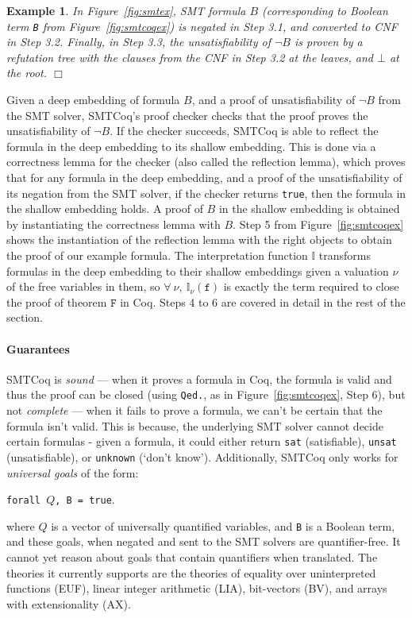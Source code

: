 \documentclass[11pt]{article}
\newtheorem{example}{Example}[section]
\begin{document}
	\begin{example} 
		\em In Figure~\ref{fig:smtex}, 
		SMT formula $B$ (corresponding
		to Boolean term \texttt{B}
		from Figure~\ref{fig:smtcoqex}) is 
		negated in Step 3.1, and converted 
		to CNF in Step 3.2.
		Finally, in Step 3.3, the 
		unsatisfiability of $\neg B$ is 
		proven by a refutation tree with 
		the clauses from the CNF in Step 3.2
		at the leaves, and $\bot$ at the 
		root. \hfill $\Box$
	\end{example}

	Given a deep embedding of 
	formula $B$, and a proof of 
	unsatisfiability of $\neg B$
	from the SMT solver, SMTCoq's proof 
	checker checks that the proof proves
	the unsatisfiability of $\neg B$. If the 
	checker succeeds, SMTCoq is able to 
	reflect the formula in 
	the deep embedding to its shallow 
	embedding. This is done via a 
	correctness lemma for the checker
	(also called the reflection lemma),
	which proves that for any 
	formula in the deep embedding, and 
	a proof of the unsatisfiability of its 
	negation from the SMT solver, if 
	the checker returns \texttt{true}, 
	then the formula in 
	the shallow embedding holds. A 
	proof of $B$ in the shallow 
	embedding is obtained by instantiating 
	the correctness lemma with $B$.
	Step 5 from Figure~\ref{fig:smtcoqex} 
	shows the instantiation of 
	the reflection lemma with 
	the right objects to obtain the 
	proof of our example formula. 
	The interpretation function
	$\mathbb{I}$ transforms 
	formulas in the deep embedding
	to their shallow embeddings
	given a valuation $\nu$ of the 
	free variables in them, so 
	$\forall\ \nu,\ 
	\mathbb{I}_{\nu}(\texttt{f})$
	is exactly the term required 
	to close the proof of 
	theorem $\texttt{F}$
	in Coq. Steps 4 to 6 are covered
	in detail in the rest of the section.
	
	\paragraph{Guarantees}
	SMTCoq is \textit{sound} ---
	when it proves a formula in Coq, the 
	formula is valid and thus the proof
	can be closed (using \texttt{Qed.},
	as in Figure~\ref{fig:smtcoqex}, 
	Step 6), but 
	not \textit{complete} --- when it 
	fails to prove a formula, we can't 
	be certain that the formula isn't 
	valid. This is because, the underlying 
	SMT solver cannot decide certain 
	formulas - given a formula, it could 
	either return \texttt{sat} 
	(satisfiable), \texttt{unsat} 
	(unsatisfiable), or 
	\texttt{unknown} (`don't know').
	Additionally, SMTCoq only works for 
	\textit{universal goals} of the form:
	\begin{center}
		\texttt{forall $Q$, \texttt{B} = true}.
	\end{center}
	where $Q$ is a vector of universally
	quantified variables, and \texttt{B} is
	a Boolean term,
	and these goals, when negated and sent 
	to the SMT solvers are quantifier-free. 
	It cannot yet reason about goals that 
	contain quantifiers when translated. The 
	theories it currently supports 
	are the theories of equality over
	uninterpreted functions (EUF), 
	linear integer arithmetic (LIA),
	bit-vectors (BV), and arrays with
	extensionality (AX).
	
\end{document}
